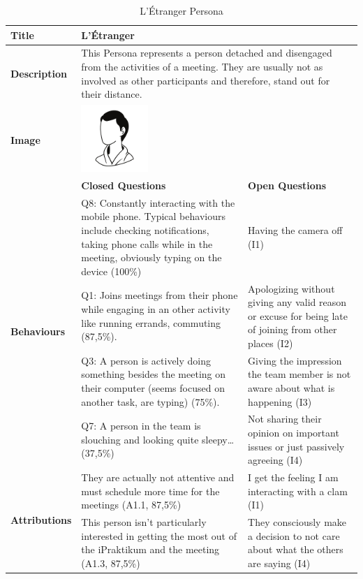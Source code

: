 \begin{longtable}[ht]{ p{}  p{} p{} }
\caption{L'Étranger Persona}
\label{tab:theDetached}\\
\hline
\textbf{Title} & L'Étranger \\
    \hline
   \textbf{Description} &  \multicolumn{2}{p{.80\textwidth}}{This Persona represents a person detached and disengaged from the activities of a meeting. They are usually not as involved as other participants and therefore, stand out for their distance.} \\
   \hline
   \textbf{Image} &  \includegraphics[valign=t, width=1in, margin=0pt 3pt 0pt 3pt]{figures/TheStranger.png} \\
   \hline
    & \textbf{Closed Questions} & \textbf{Open Questions} \\
    \hline
    \multirow{4}{3cm}{\textbf{Behaviours}}  & Q8: Constantly interacting with the mobile phone. Typical behaviours include checking notifications, taking phone calls while in the meeting, obviously typing on the device (100\%) & Having the camera off (I1) \\
     &  Q1: Joins meetings from their phone while engaging in an other activity like running errands, commuting (87,5\%).  & Apologizing without giving any valid reason or excuse for being late of joining from other places  (I2) \\
     & Q3: A person is actively doing something besides the meeting on their computer (seems focused on another task, are typing) (75\%). & Giving the impression the team member is not aware about what is happening (I3) \\
 	 & Q7: A person in the team is slouching and looking quite sleepy… (37,5\%) & Not sharing their opinion on important issues or just passively agreeing (I4) \\
    \hline
    \multirow{10}{3cm}{\textbf{Attributions}}  & They are actually not attentive and must schedule more time for the meetings (A1.1, 87,5\%) & I get the feeling I am interacting with a clam (I1)  \\
     & This person isn't particularly interested in getting the most out of the iPraktikum and the meeting (A1.3, 87,5\%) & They consciously make a decision to not care about what the others are saying (I4) \\

\end{longtable}
